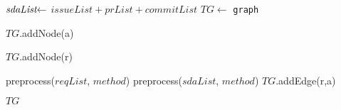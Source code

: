 \begin{breakablealgorithm}
\begin{algorithmic}[1]


\State $\textit{sdaList} \hspace{-0.1cm} \leftarrow$  \hspace{-0.2cm} $issueList+prList+commitList$\label{algl:m}
\State $TG \leftarrow$  \texttt{graph} 

 \label{algl:c}
\State $TG$.addNode(a)
\EndFor \label{algl:c}

 \label{algl:c}
\State $TG$.addNode(r)
\EndFor \label{algl:c}



\State preprocess($reqList$, $method$)
\State preprocess($sdaList$, $method$)
 \label{algl:c}
 \label{algl:c}
\State $TG$.addEdge(r,a)
\EndIf
\EndFor \label{algl:c}
\EndFor \label{algl:c}


\Return $TG$
\end{algorithmic}
\end{breakablealgorithm}

